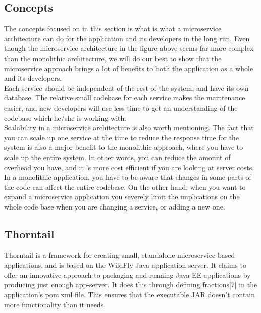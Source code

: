 \subsection{Concepts}
The concepts focused on in this section is what is what a microservice architecture can do for the application and its developers in the long run. Even though the microservice architecture in the {figure above} seems far more complex than the monolithic architecture, we will do our best to show that the microservice approach brings a lot of benefits to both the application as a whole and its developers. \\
\newline
Each service should be independent of the rest of the system, and have its own database. The relative small codebase for each service makes the maintenance easier, and new developers will use less time to get an understanding of the codebase which he/she is working with. \\
\newline
Scalability in a microservice architecture is also worth mentioning. The fact that you can scale up one service at the time to reduce the response time for the system is also a major benefit to the monolithic approach, where you have to scale up the entire system. In other words, you can reduce the amount of overhead you have, and it ’s more cost efficient if you are looking at server costs.\\
\newline
In a monolithic application, you have to be aware that changes in some parts of the code can affect the entire codebase. On the other hand, when you want to expand a microservice application you severely limit the implications on the whole code base when you are changing a service, or adding a new one. \cite{MonolithArch} \\
\subsection{Thorntail}
Thorntail is a framework for creating small, standalone microservice-based applications, and is based on the WildFly Java application server. It claims to offer an innovative approach to packaging and running Java EE applications by producing just enough app-server. It does this through defining fractions[7] in the application’s pom.xml file. This ensures that the executable JAR doesn’t contain more functionality than it needs. \cite{ThorntailDoc}

